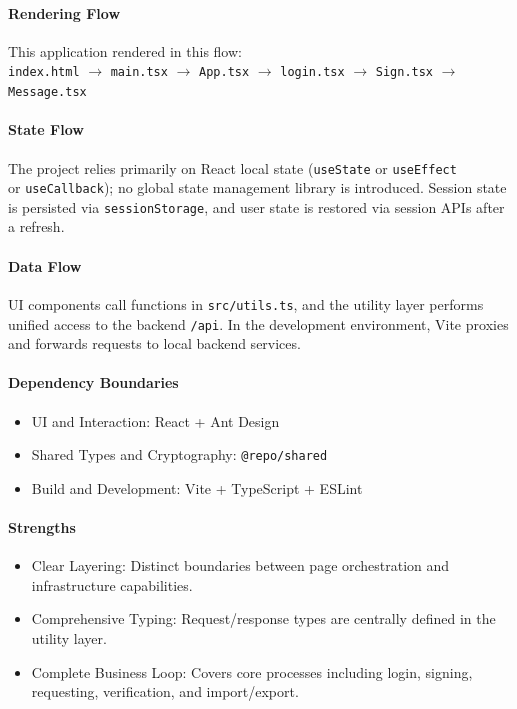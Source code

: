 \documentclass[letterpaper,11pt]{article}
\begin{document}
\paragraph{Rendering Flow} This application rendered in this flow: \\
\texttt{index.html} $\rightarrow$ \texttt{main.tsx} $\rightarrow$ \texttt{App.tsx} $\rightarrow$ \texttt{login.tsx} $\rightarrow$ \texttt{Sign.tsx} $\rightarrow$ \texttt{Message.tsx}

\paragraph{State Flow}
The project relies primarily on React local state (\texttt{useState} or \texttt{useEffect} \\ or \texttt{useCallback}); no global state management library is introduced.
Session state is persisted via \texttt{sessionStorage}, and user state is restored via session APIs after a refresh.

\paragraph{Data Flow}
UI components call functions in \texttt{src/utils.ts}, and the utility layer performs unified access to the backend \texttt{/api}.
In the development environment, Vite proxies and forwards requests to local backend services.

\paragraph{Dependency Boundaries}
\begin{itemize}[leftmargin=2em]
    \item UI and Interaction: React + Ant Design
    \item Shared Types and Cryptography: \texttt{@repo/shared}
    \item Build and Development: Vite + TypeScript + ESLint
\end{itemize}

\paragraph{Strengths}
\begin{itemize}[leftmargin=2em]
    \item Clear Layering: Distinct boundaries between page orchestration and infrastructure capabilities.
    \item Comprehensive Typing: Request/response types are centrally defined in the utility layer.
    \item Complete Business Loop: Covers core processes including login, signing, requesting, verification, and import/export.
\end{itemize}
\end{document}
